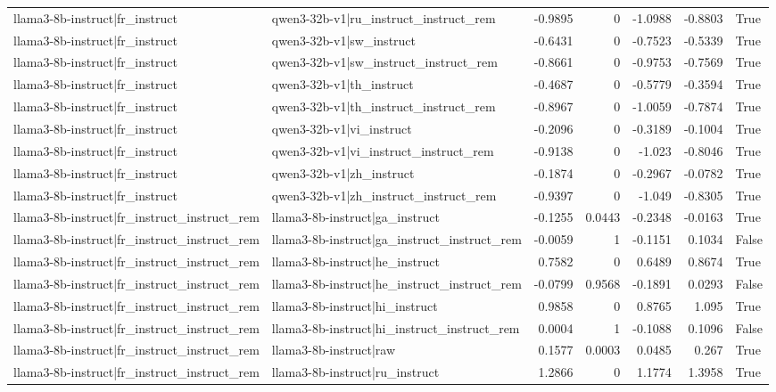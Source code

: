 \begin{table}
\begin{tabular}{l l r r r r l}
llama3-8b-instruct|fr_instruct & qwen3-32b-v1|ru_instruct_instruct_rem & -0.9895 & 0 & -1.0988 & -0.8803 & True \\
llama3-8b-instruct|fr_instruct & qwen3-32b-v1|sw_instruct & -0.6431 & 0 & -0.7523 & -0.5339 & True \\
llama3-8b-instruct|fr_instruct & qwen3-32b-v1|sw_instruct_instruct_rem & -0.8661 & 0 & -0.9753 & -0.7569 & True \\
llama3-8b-instruct|fr_instruct & qwen3-32b-v1|th_instruct & -0.4687 & 0 & -0.5779 & -0.3594 & True \\
llama3-8b-instruct|fr_instruct & qwen3-32b-v1|th_instruct_instruct_rem & -0.8967 & 0 & -1.0059 & -0.7874 & True \\
llama3-8b-instruct|fr_instruct & qwen3-32b-v1|vi_instruct & -0.2096 & 0 & -0.3189 & -0.1004 & True \\
llama3-8b-instruct|fr_instruct & qwen3-32b-v1|vi_instruct_instruct_rem & -0.9138 & 0 & -1.023 & -0.8046 & True \\
llama3-8b-instruct|fr_instruct & qwen3-32b-v1|zh_instruct & -0.1874 & 0 & -0.2967 & -0.0782 & True \\
llama3-8b-instruct|fr_instruct & qwen3-32b-v1|zh_instruct_instruct_rem & -0.9397 & 0 & -1.049 & -0.8305 & True \\
llama3-8b-instruct|fr_instruct_instruct_rem & llama3-8b-instruct|ga_instruct & -0.1255 & 0.0443 & -0.2348 & -0.0163 & True \\
llama3-8b-instruct|fr_instruct_instruct_rem & llama3-8b-instruct|ga_instruct_instruct_rem & -0.0059 & 1 & -0.1151 & 0.1034 & False \\
llama3-8b-instruct|fr_instruct_instruct_rem & llama3-8b-instruct|he_instruct & 0.7582 & 0 & 0.6489 & 0.8674 & True \\
llama3-8b-instruct|fr_instruct_instruct_rem & llama3-8b-instruct|he_instruct_instruct_rem & -0.0799 & 0.9568 & -0.1891 & 0.0293 & False \\
llama3-8b-instruct|fr_instruct_instruct_rem & llama3-8b-instruct|hi_instruct & 0.9858 & 0 & 0.8765 & 1.095 & True \\
llama3-8b-instruct|fr_instruct_instruct_rem & llama3-8b-instruct|hi_instruct_instruct_rem & 0.0004 & 1 & -0.1088 & 0.1096 & False \\
llama3-8b-instruct|fr_instruct_instruct_rem & llama3-8b-instruct|raw & 0.1577 & 0.0003 & 0.0485 & 0.267 & True \\
llama3-8b-instruct|fr_instruct_instruct_rem & llama3-8b-instruct|ru_instruct & 1.2866 & 0 & 1.1774 & 1.3958 & True \\

\end{tabular}
\end{table}
